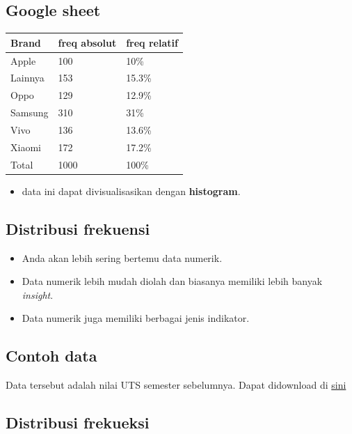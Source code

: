\documentclass[
  letterpaper,
  DIV=11,
  numbers=noendperiod]{scrartcl}
\providecommand{\tightlist}{%
  \setlength{\itemsep}{0pt}\setlength{\parskip}{0pt}}\usepackage{longtable,booktabs,array}
\begin{document}
\subsection{Google sheet}\label{google-sheet-1}

\begin{longtable}[]{@{}lll@{}}
\toprule\noalign{}
Brand & freq absolut & freq relatif \\
\midrule\noalign{}
\endhead
\bottomrule\noalign{}
\endlastfoot
Apple & 100 & 10\% \\
Lainnya & 153 & 15.3\% \\
Oppo & 129 & 12.9\% \\
Samsung & 310 & 31\% \\
Vivo & 136 & 13.6\% \\
Xiaomi & 172 & 17.2\% \\
Total & 1000 & 100\% \\
\end{longtable}

\begin{itemize}
\tightlist
\item
  data ini dapat divisualisasikan dengan \textbf{histogram}.
\end{itemize}

\subsection{Distribusi frekuensi}\label{distribusi-frekuensi-1}

\begin{itemize}
\item
  Anda akan lebih sering bertemu data numerik.
\item
  Data numerik lebih mudah diolah dan biasanya memiliki lebih banyak
  \emph{insight}.
\item
  Data numerik juga memiliki berbagai jenis indikator.
\end{itemize}

\subsection{Contoh data}\label{contoh-data}

Data tersebut adalah nilai UTS semester sebelumnya. Dapat didownload di
\href{https://docs.google.com/spreadsheets/d/e/2PACX-1vSdLsm-5nIFgcspOncjaLwwKX1vmGbTOvhkYVOFWdHS3h15EWmHcXDSm562eyR4MiftmPJiPom7X2RM/pubhtml}{sini}

\subsection{Distribusi frekueksi}\label{distribusi-frekueksi}
\end{document}
